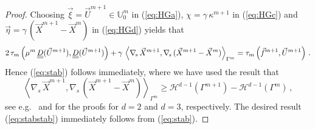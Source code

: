 \documentclass[a4paper,12pt,onecolumn]{article}
\newcommand{\uspace}{\mathbb{U}}
\newcommand{\nabs}{\nabla_{\!s}}
\newcommand{\mat}[1]{\underline{\underline{#1}}\rule{0pt}{0pt}}
\begin{document}
\begin{proof}
Choosing $\vec\xi = \vec U^{m+1} \in \uspace^m_0$ in (\ref{eq:HGa}), $\chi =
\gamma\,\kappa^{m+1}$ in (\ref{eq:HGc}) and
$\vec\eta=\gamma\,({\vec{X}^{m+1}-\vec{X}^m})$ in (\ref{eq:HGd}) yields that
\begin{equation*}
2\,\tau_m\left(\mu^m\,\mat D(\vec U^{m+1}), \mat D(\vec U^{m+1}) \right) +
\gamma\,\left\langle \nabs\,\vec{X}^{m+1}, \nabs\,(\vec{X}^{m+1} - \vec{X}^m)
\right\rangle_{\Gamma^m}= \tau_m\left(\vec f^{m+1}, \vec U^{m+1} \right)\,.
\end{equation*}
Hence (\ref{eq:stab}) follows immediately, where we have used the result that
\begin{equation*}
\left\langle \nabs\,\vec{X}^{m+1}, \nabs\,(\vec{X}^{m+1} - \vec{X}^m)
\right\rangle_{\Gamma^m} \geq \mathcal{H}^{d-1}(\Gamma^{m+1}) -
\mathcal{H}^{d-1}(\Gamma^{m})\,,
\end{equation*}
see e.g.\ \cite[Proof of Theorem~2.3]{triplej} and \cite[Proof of
Theorem~2.2]{gflows3d} for the proofs for $d=2$ and $d=3$, respectively. The
desired result (\ref{eq:stabstab}) immediately follows from (\ref{eq:stab}).
\end{proof}
\end{document}
